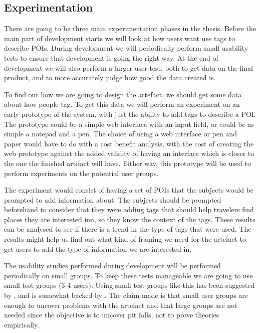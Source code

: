 \subsection{Experimentation}
There are going to be three main experimentation phases in the thesis.
Before the main part of development starts we will look at how users want use tags to describe POIs.
During development we will periodically perform small usability tests to ensure that development is going the right way.
At the end of development we will also perform a larger user test, both to get data on the final product, and to more accurately judge how good the data created is.

To find out how we are going to design the artefact, we should get some data about how people tag.
To get this data we will perform an experiment on an early prototype of the system, with just the ability to add tags to describe a POI. 
The prototype could be a simple web interface with an input field, or could be as simple a notepad and a pen.
The choice of using a web interface or pen and paper would have to do with a cost benefit analysis, 
with the cost of creating the web prototype against the added validity of having an interface which is closer to the one the finished artifact will have.
Either way, this prototype will be used to perform experiments on the potential user groups. 

The experiment would consist of having a set of POIs that the subjects would be prompted to add information about. 
The subjects should be prompted beforehand to consider that they were adding tags that should help travelers find places they are interested inn, so they know the context of the tags.
These results can be analysed to see if there is a trend in the type of tags that were used. 
The results might help us find out what kind of framing we need for the artefact to get users to add the type of information we are interested in.

The usability studies performed during development will be performed periodically on small groups.
To keep these tests manageable we are going to use small test groups (3-4 users).
Using small test groups like this has been suggested by \citet{Nielsen2000}, and is somewhat backed by \citet{Bevan2003}. 
The claim made is that small user groups are enough to uncover problems with the artefact and that large groups are not needed
since the objective is to uncover pit falls, not to prove theories empirically.

